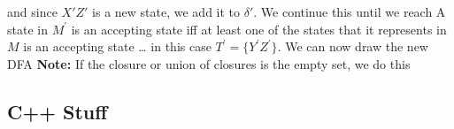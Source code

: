 \documentclass{report}
\begin{document}
\begin{itemize}
\[    \]
    and since $X'Z'$ is a new state, we add it to $\delta'$.
    \bigbreak \noindent 
    We continue this until we reach 
    \bigbreak \noindent 
    \bigbreak \noindent 
    A state in $M^{\prime}$ is an accepting state iff at least one of the states that it represents in $M$ is an accepting state … in this case $T^{\prime}= \{Y^{\prime}Z^{\prime}\}$.
    \bigbreak \noindent 
    We can now draw the new DFA 
    \bigbreak \noindent 
    \bigbreak \noindent 
    \textbf{Note:} If the closure or union of closures is the empty set, we do this
    \bigbreak \noindent 




    \end{itemize}


    \pagebreak 
    \bigbreak \noindent 
    \subsection{C++ Stuff}
    \bigbreak \noindent 
\end{document}
